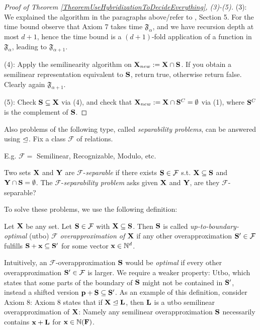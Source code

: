 \begin{proof}[Proof of Theorem \ref{TheoremUseHybridizationToDecideEverything}, (3)-(5)]
(3): We explained the algorithm in the paragraphs above/refer to \cite{GuttenbergRE23}, Section 5. For the time bound observe that Axiom 7 takes time \(\mathfrak{F}_{\alpha}\), and we have recursion depth at most \(d+1\), hence the time bound is a \((d+1)\)-fold application of a function in \(\mathfrak{F}_{\alpha}\), leading to \(\mathfrak{F}_{\alpha+1}\).

(4): Apply the semilinearity algorithm on \(\mathbf{X}_{new}:=\mathbf{X} \cap \mathbf{S}\). If you obtain a semilinear representation equivalent to \(\mathbf{S}\), return true, otherwise return false. Clearly again \(\mathfrak{F}_{\alpha+1}\).

(5): Check \(\mathbf{S} \subseteq \mathbf{X}\) via (4), and check that \(\mathbf{X}_{new}:=\mathbf{X} \cap \mathbf{S}^{C}=\emptyset\) via (1), where \(\mathbf{S}^C\) is the complement of \(\mathbf{S}\).
\end{proof}

Also problems of the following type, called \emph{separability problems}, can be answered using \(\trianglelefteq\). Fix a class \(\mathcal{F}\) of relations.

E.g. \(\mathcal{F}=\) Semilinear, Recognizable, Modulo, etc.

\begin{definition}
Two sets \(\mathbf{X}\) and \(\mathbf{Y}\) are \(\mathcal{F}\)-\emph{separable} if there exists \(\mathbf{S} \in \mathcal{F}\) s.t. \(\mathbf{X} \subseteq \mathbf{S}\) and \(\mathbf{Y} \cap \mathbf{S}=\emptyset\). The \(\mathcal{F}\)-\emph{separability problem} asks given \(\mathbf{X}\) and \(\mathbf{Y}\), are they \(\mathcal{F}\)-separable?
\end{definition} 

To solve these problems, we use the following definition:

\begin{definition}
Let \(\mathbf{X}\) be any set. Let \(\mathbf{S} \in \mathcal{F}\) with \(\mathbf{X} \subseteq \mathbf{S}\). Then \(\mathbf{S}\) is called \emph{up-to-boundary-optimal} (utbo) \(\mathcal{F}\) \emph{overapproximation of} \(\mathbf{X}\) if any other overapproximation \(\mathbf{S}' \in \mathcal{F}\) fulfills \(\mathbf{S}+\mathbf{x} \subseteq \mathbf{S}'\) for some vector \(\mathbf{x}\in \mathbb{N}^d\).
\end{definition}

Intuitively, an \(\mathcal{F}\)-overapproximation \(\mathbf{S}\) would be \emph{optimal} if every other overapproximation \(\mathbf{S}' \in \mathcal{F}\) is larger. We require a weaker property: Utbo, which states that some parts of the boundary of \(\mathbf{S}\) might not be contained in \(\mathbf{S}'\), instead a shifted version \(\mathbf{p}+\mathbf{S} \subseteq \mathbf{S}'\). As an example of this definition, consider Axiom 8: Axiom 8 states that if \(\mathbf{X} \trianglelefteq \mathbf{L}\), then \(\mathbf{L}\) is a utbo semilinear overapproximation of \(\mathbf{X}\): Namely any semilinear overapproximation \(\mathbf{S}\) necessarily contains \(\mathbf{x}+\mathbf{L}\) for \(\mathbf{x} \in \mathbb{N}(\mathbf{F})\).

